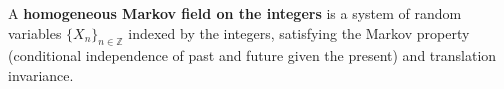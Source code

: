 A \textbf{homogeneous Markov field on the integers} is a system of random variables $\{X_n\}_{n \in \mathbb{Z}}$ indexed by the integers, satisfying the Markov property (conditional independence of past and future given the present) and translation invariance.